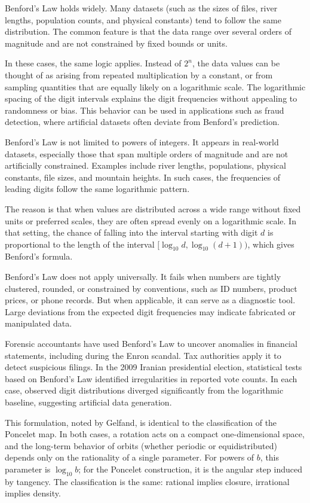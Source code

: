 Benford’s Law holds widely. Many datasets (such as the sizes of files, river lengths, population counts, and physical constants) tend to follow the same distribution. The common feature is that the data range over several orders of magnitude and are not constrained by fixed bounds or units.

In these cases, the same logic applies. Instead of $2^n$, the data values can be thought of as arising from repeated multiplication by a constant, or from sampling quantities that are equally likely on a logarithmic scale. The logarithmic spacing of the digit intervals explains the digit frequencies without appealing to randomness or bias. This behavior can be used in applications such as fraud detection, where artificial datasets often deviate from Benford’s prediction.

Benford’s Law is not limited to powers of integers. It appears in real-world datasets, especially those that span multiple orders of magnitude and are not artificially constrained. Examples include river lengths, populations, physical constants, file sizes, and mountain heights. In such cases, the frequencies of leading digits follow the same logarithmic pattern.

The reason is that when values are distributed across a wide range without fixed units or preferred scales, they are often spread evenly on a logarithmic scale. In that setting, the chance of falling into the interval starting with digit $d$ is proportional to the length of the interval $[\log_{10} d, \log_{10}(d+1))$, which gives Benford’s formula.

Benford’s Law does not apply universally. It fails when numbers are tightly clustered, rounded, or constrained by conventions, such as ID numbers, product prices, or phone records. But when applicable, it can serve as a diagnostic tool. Large deviations from the expected digit frequencies may indicate fabricated or manipulated data.

Forensic accountants have used Benford's Law to uncover anomalies in financial statements, including during the Enron scandal. Tax authorities apply it to detect suspicious filings. In the 2009 Iranian presidential election, statistical tests based on Benford’s Law identified irregularities in reported vote counts. In each case, observed digit distributions diverged significantly from the logarithmic baseline, suggesting artificial data generation.

This formulation, noted by Gelfand, is identical to the classification of the Poncelet map. In both cases, a rotation acts on a compact one-dimensional space, and the long-term behavior of orbits (whether periodic or equidistributed) depends only on the rationality of a single parameter. For powers of $b$, this parameter is $\log_{10} b$; for the Poncelet construction, it is the angular step induced by tangency. The classification is the same: rational implies closure, irrational implies density.

